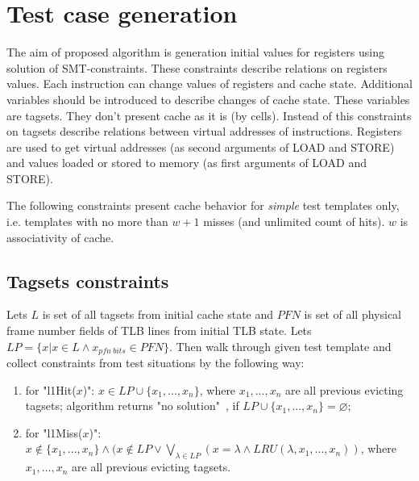 \documentclass[times, 10pt,twocolumn]{article}
\begin{document}
\section{Test case generation}

The aim of proposed algorithm is generation initial values for registers using solution of SMT-constraints. These constraints describe relations on registers values. Each instruction can change values of registers and cache state. Additional variables should be introduced to describe changes of cache state. These variables are tagsets. They don't present cache as it is (by cells). Instead of this constraints on tagsets describe relations between virtual addresses of instructions. Registers are used to get virtual addresses (as second arguments of LOAD and STORE) and values loaded or stored to memory (as first arguments of LOAD and STORE).

The following constraints present cache behavior for \emph{simple} test templates only, i.e. templates with no more than $w+1$ misses (and unlimited count of hits). $w$ is associativity of cache.

\subsection{Tagsets constraints}
Lets $L$ is set of all tagsets from initial cache state and $PFN$ is set of all physical frame number fields of TLB lines from initial TLB state. Lets $LP = \{ x | x \in L \wedge x_{pfn~bits} \in PFN\}$. Then walk through given test template and collect constraints from test situations by the following way:
\begin{enumerate}
\item for "l1Hit($x$)": $x \in LP \cup \{ x_1, ..., x_n \}$, where $x_1, ..., x_n$ are all previous evicting tagsets; algorithm returns "no solution"\ , if $LP \cup \{ x_1, ..., x_n \} = \varnothing$;
\item for "l1Miss($x$)": $x \notin \{x_1, ..., x_n \} \wedge (x \notin LP \vee \bigvee_{\lambda \in LP} (x = \lambda \wedge LRU(\lambda, x_1, ..., x_n))$, where $x_1, ..., x_n$ are all previous evicting tagsets.
\end{enumerate}
\end{document}

